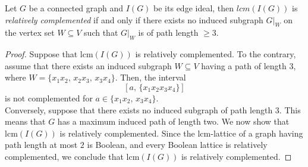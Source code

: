 \documentclass[10pt,a4paper]{amsart}
\newcommand{\lcm}{\mathrm{lcm}}
\begin{document}
\begin{theorem}
     Let $G$ be a connected graph and $I(G)$ be its edge ideal, then $lcm(I(G))$ is \emph{relatively complemented} if and only if there exists no induced subgraph $G|_W$ on the vertex set $W \subseteq V$ such that ${G|_W}$ is of path length $ \geq 3$.
\end{theorem}

\begin{proof}
%
%
%
%

%
     Suppose that $\lcm(I(G))$ is relatively complemented. 
To the contrary, assume that there exists an induced subgraph $W \subseteq V$ having a path of length $3$, where 
$W = \{x_1x_2,\, x_2x_3,\, x_3x_4\}$. 
Then, the interval 
\[
[a,\, \{x_1x_2x_3x_4\}]
\]
is not complemented for $a \in \{x_1x_2,\, x_3x_4\}$. \\[4pt]
Conversely, suppose that there exists no induced subgraph of path length $3$. 
This means that $G$ has a maximum induced path of length two. 
We now show that $\lcm(I(G))$ is relatively complemented. 
Since the $\lcm$-lattice of a graph having path length at most $2$ is Boolean, and every Boolean lattice is relatively complemented, we conclude that $\lcm(I(G))$ is relatively complemented.

\end{proof}
\end{document}
